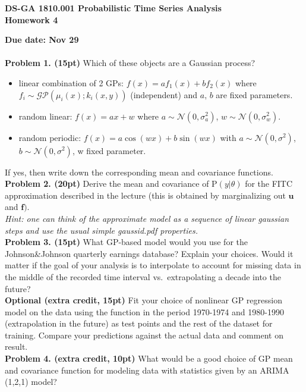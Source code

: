 \documentclass[12pt]{article}
\newcommand{\p}{\mathrm{P}}
\newcommand{\vect}[1]{\mathbf{#1}}
\begin{document}
\thispagestyle{empty}
\begin{center}

\textbf{DS-GA 1810.001 Probabilistic Time Series Analysis\\
Homework 4}
\end{center}

\noindent \textbf{Due date: Nov 29}\\
\\
\noindent \textbf{Problem 1. (15pt)} Which of these objects are a Gaussian process?
\begin{itemize}
\item linear combination of 2 GPs: $f(x) = a f_1(x) + b f_2(x)$ where $f_i \sim \mathcal{GP}(\mu_i(x); k_i(x,y))$ (independent) and $a,\, b$ are fixed parameters.
\item random linear: $ f(x) = a x + w$ where $a \sim \mathcal{N}(0,\sigma_a^2)$, $w\sim \mathcal{N}(0,\sigma_w^2)$.
\item random periodic: $f(x) = a \cos(wx)+ b \sin(wx)$ with $a \sim \mathcal{N}(0,\sigma^2)$, $b \sim \mathcal{N}(0,\sigma^2)$, w fixed parameter.
\end{itemize}
If yes, then write down the corresponding mean and covariance functions.\\

\noindent \textbf{Problem 2. (20pt)} 
Derive the mean and covariance of  $\mathrm{P}(y|\theta)$ for the FITC approximation described in the lecture (this is obtained by marginalizing out $\mathbf{u}$ and $\mathbf{f})$.\\
\noindent \emph{Hint: one can think of the approximate model as a sequence of linear gaussian steps and use the usual simple gaussid.pdf properties.}\\

\noindent \textbf{Problem 3. (15pt)} 
What GP-based model would you use for the Johnson\&Johnson quarterly earnings database?
Explain your choices. Would it matter if the goal of your analysis is to interpolate to account for missing data in the middle of the recorded time interval vs.\ extrapolating a decade into the future?\\

\noindent \textbf{Optional (extra credit, 15pt)}
Fit your choice of nonlinear GP regression model on the data using the function in the period 1970-1974 and 1980-1990 (extrapolation in the future) as test points and the rest of the dataset for training. Compare your predictions against the actual data and comment on result.\\

\noindent \textbf{Problem 4. (extra credit, 10pt)} 
What would be a good choice of GP mean and covariance function for modeling data with statistics given by an ARIMA (1,2,1) model?\\
\end{document}
